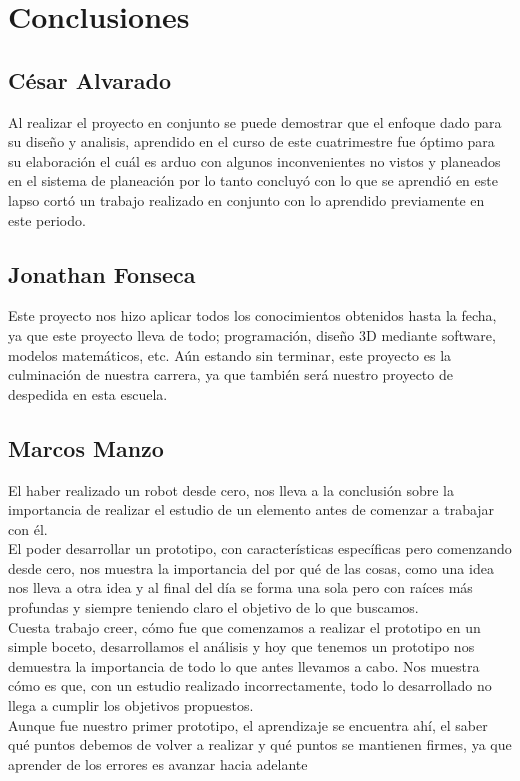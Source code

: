 \documentclass[11pt,a4paper,oldfontcommands,oneside]{memoir}
\begin{document}
\begin{center}
\end{center}

\chapter{Conclusiones}
\section{César Alvarado}
Al realizar el proyecto en conjunto se puede demostrar que el enfoque dado para su diseño y analisis, aprendido en el curso de este cuatrimestre fue óptimo para su elaboración el cuál es arduo con algunos inconvenientes no vistos y planeados en el sistema de planeación por lo tanto concluyó con lo que se aprendió en este lapso cortó un trabajo realizado en conjunto con lo aprendido previamente en este periodo.
\section{Jonathan Fonseca}
Este proyecto nos hizo aplicar todos los conocimientos obtenidos hasta la fecha, ya que este proyecto lleva de todo; programación, diseño 3D mediante software, modelos matemáticos, etc. Aún estando sin terminar, este proyecto es la culminación de nuestra carrera, ya que también será nuestro proyecto de despedida en esta escuela.
\section{Marcos Manzo}
El haber realizado un robot desde cero, nos lleva a la conclusión sobre la importancia de realizar el estudio de un elemento antes de comenzar a trabajar con él.\\
El poder desarrollar un prototipo, con características específicas pero comenzando desde cero, nos muestra la importancia del por qué de las cosas, como una idea nos lleva a otra idea y al final del día se forma una sola pero con raíces más profundas y siempre teniendo claro el objetivo de lo que buscamos.\\
Cuesta trabajo creer, cómo fue que comenzamos a realizar el prototipo en un simple boceto, desarrollamos el análisis y hoy que tenemos un prototipo nos demuestra la importancia de todo lo que antes llevamos a cabo. Nos muestra cómo es que, con un estudio realizado incorrectamente, todo lo desarrollado no llega a cumplir los objetivos propuestos.\\
Aunque fue nuestro primer prototipo, el aprendizaje se encuentra ahí, el saber qué puntos debemos de volver a realizar y qué puntos se mantienen firmes, ya que aprender de los errores es avanzar hacia adelante
\end{document}
